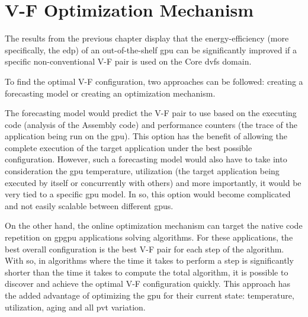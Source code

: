 
\chapter{V-F Optimization Mechanism}
\label{chapter:mech}


The results from the previous chapter display that the energy-efficiency (more specifically, the \acrshort{edp}) of an out-of-the-shelf \acrshort{gpu} can be significantly improved if a specific non-conventional V-F pair is used on the Core \acrshort{dvfs} domain. 

To find the optimal V-F configuration, two approaches can be followed: creating a forecasting model or creating an optimization mechanism.

The forecasting model would predict the V-F pair to use based on the executing code (analysis of the Assembly code) and performance counters (the trace of the application being run on the \acrshort{gpu}). This option has the benefit of allowing the complete execution of the target application under the best possible configuration. However, such a forecasting model would also have to take into consideration the \acrshort{gpu} temperature, utilization (the target application being executed by itself or concurrently with others) and more importantly, it would be very tied to a specific \acrshort{gpu} model. In so, this option would become complicated and not easily scalable between different \acrshort{gpu}s.

On the other hand, the online optimization mechanism can target the native code repetition on \acrshort{gpgpu} applications solving algorithms. For these applications, the best overall configuration is the best V-F pair for each step of the algorithm. With so, in algorithms where the time it takes to perform a step is significantly shorter than the time it takes to compute the total algorithm, it is possible to discover and achieve the optimal V-F configuration quickly. This approach has the added advantage of optimizing the \acrshort{gpu} for their current state: temperature, utilization, aging and all \acrshort{pvt} variation.

